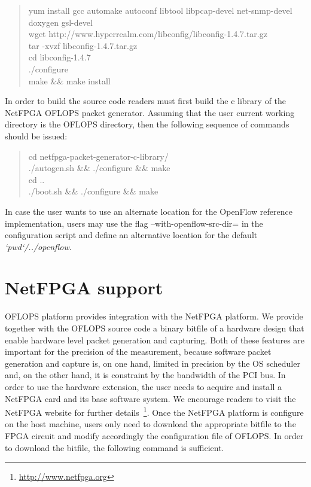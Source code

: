 \documentclass{book}
\begin{document}
      \begin{quote}
      yum install gcc automake autoconf libtool libpcap-devel net-snmp-devel
      doxygen gsl-devel\\
        wget http://www.hyperrealm.com/libconfig/libconfig-1.4.7.tar.gz\\
        tar -xvzf libconfig-1.4.7.tar.gz \\
        cd libconfig-1.4.7 \\
        ./configure \\
        make \&\& make install 
        \end{quote}

        In order to build the source code readers must first build the c library of the
        NetFPGA OFLOPS packet generator. Assuming that the user current working 
        directory is the OFLOPS directory, then the following sequence of commands 
        should be issued:

        \begin{quote}
        cd netfpga-packet-generator-c-library/ \\
          ./autogen.sh \&\& ./configure \&\& make \\
          cd .. \\
          ./boot.sh \&\& ./configure \&\& make \\
          \end{quote}

          In case the user wants to use an alternate location for the OpenFlow reference
          implementation, users may use the flag --with-openflow-src-dir= in the
          configuration script and define an alternative location for the default
          \emph{`pwd`/../openflow}. 

          \section{NetFPGA support}

          OFLOPS platform provides integration with the NetFPGA platform.
          We provide together with the OFLOPS source code a binary bitfile of a hardware
          design that enable hardware level packet generation and capturing. 
          Both of these features are
          important for the precision of the measurement, because software packet generation 
          and capture is, on one hand, limited in 
          precision by the OS scheduler and, on the other hand, it is constraint by the 
          bandwidth of the PCI bus. In order to use the hardware extension, the
          user needs to acquire and install a NetFPGA card and its base software system.
          We encourage readers to visit the NetFPGA website for further
          details~\footnote{\url{http://www.netfpga.org}}. Once the NetFPGA platform is
          configure on the host machine, users only need to download the appropriate bitfile to the FPGA
          circuit and modify accordingly the configuration file of OFLOPS. In order to
          download the bitfile, the following command is sufficient. 
\end{document}
